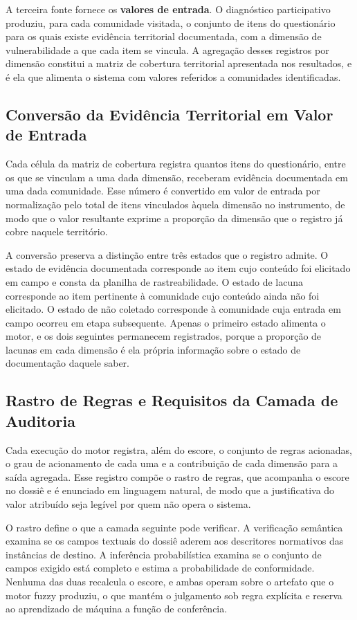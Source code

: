\documentclass[pdflatex,sn-basic]{sn-jnl}%
\theoremstyle{thmstyleone}%
\theoremstyle{thmstyletwo}%
\theoremstyle{thmstylethree}%
\begin{document}
A terceira fonte fornece os \textbf{valores de entrada}. O diagnóstico participativo produziu, para cada comunidade visitada, o conjunto de itens do questionário para os quais existe evidência territorial documentada, com a dimensão de vulnerabilidade a que cada item se vincula. A agregação desses registros por dimensão constitui a matriz de cobertura territorial apresentada nos resultados, e é ela que alimenta o sistema com valores referidos a comunidades identificadas.

\subsection{Conversão da Evidência Territorial em Valor de Entrada}

Cada célula da matriz de cobertura registra quantos itens do questionário, entre os que se vinculam a uma dada dimensão, receberam evidência documentada em uma dada comunidade. Esse número é convertido em valor de entrada por normalização pelo total de itens vinculados àquela dimensão no instrumento, de modo que o valor resultante exprime a proporção da dimensão que o registro já cobre naquele território.

A conversão preserva a distinção entre três estados que o registro admite. O estado de evidência documentada corresponde ao item cujo conteúdo foi elicitado em campo e consta da planilha de rastreabilidade. O estado de lacuna corresponde ao item pertinente à comunidade cujo conteúdo ainda não foi elicitado. O estado de não coletado corresponde à comunidade cuja entrada em campo ocorreu em etapa subsequente. Apenas o primeiro estado alimenta o motor, e os dois seguintes permanecem registrados, porque a proporção de lacunas em cada dimensão é ela própria informação sobre o estado de documentação daquele saber.

\subsection{Rastro de Regras e Requisitos da Camada de Auditoria}

Cada execução do motor registra, além do escore, o conjunto de regras acionadas, o grau de acionamento de cada uma e a contribuição de cada dimensão para a saída agregada. Esse registro compõe o rastro de regras, que acompanha o escore no dossiê e é enunciado em linguagem natural, de modo que a justificativa do valor atribuído seja legível por quem não opera o sistema.

O rastro define o que a camada seguinte pode verificar. A verificação semântica examina se os campos textuais do dossiê aderem aos descritores normativos das instâncias de destino. A inferência probabilística examina se o conjunto de campos exigido está completo e estima a probabilidade de conformidade. Nenhuma das duas recalcula o escore, e ambas operam sobre o artefato que o motor fuzzy produziu, o que mantém o julgamento sob regra explícita e reserva ao aprendizado de máquina a função de conferência.
\end{document}
